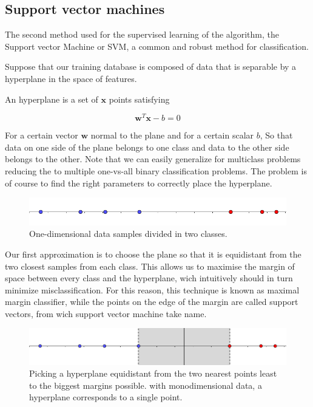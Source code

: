 \documentclass[a4paper]{report}
\begin{document}
\subsection{Support vector machines}

The second method used for the supervised learning of the algorithm, the Support vector Machine or SVM, a common and robust method for classification.

Suppose that our training database is composed of data that is separable by a hyperplane in the space of features.

An hyperplane is a set of $\textbf{x}$ points satisfying

\begin{equation}
    \textbf{w}^T\textbf{x} -b = 0
\end{equation}

For a certain vector $\textbf{w}$ normal to the plane and for a certain scalar $b$, So that data on one side of the plane belongs to one class and data to the other side belongs to the other. Note that we can easily generalize for multiclass problems reducing the to multiple one-vs-all binary classification problems. The problem is of course to find the right parameters to correctly place the hyperplane.

\begin{figure} [H]
    \centering
    \includegraphics [width=\textwidth ]{svm/1dim.png}
    \caption{One-dimensional data samples divided in two classes.}
    \label{1dim}
\end{figure}


Our first approximation is to choose the plane so that it is equidistant from the two closest samples from each class. This allows us to maximise the margin of space between every class and the hyperplane, wich intuitively should in turn minimize misclassification. For this reason, this technique is known as maximal margin classifier, while the points on the edge of the margin are called support vectors, from wich support vector machine take name.

\begin{figure} [H]
    \centering
    \includegraphics [width=\textwidth ]{svm/1dim_disq.png}
    \caption{Picking a hyperplane equidistant from the two nearest points least to the biggest margins possible. with monodimensional data, a hyperplane corresponds to a single point.}
    \label{1dim1_disq}
\end{figure}
\end{document}
